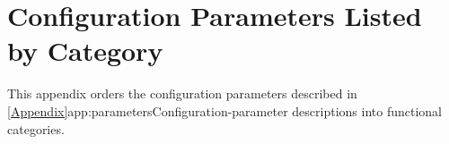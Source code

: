 \chapter{Configuration Parameters Listed by Category}
\label{app:catpars}

This appendix orders the configuration parameters described in
\cref{Appendix}{app:parameters}{Configuration-parameter descriptions}
into functional categories.

\sstminitoc{}


